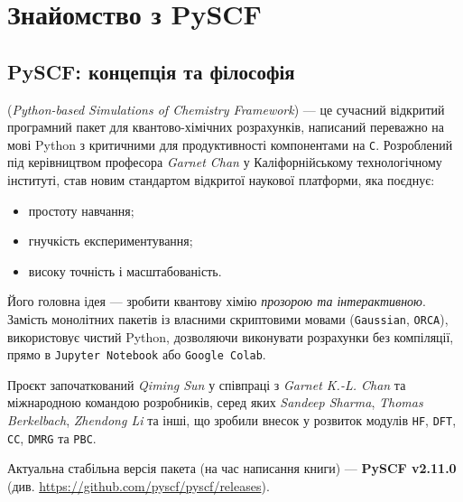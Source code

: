 
\chapter{Знайомство з PySCF}\label{\currfilebase}

\section{PySCF: концепція та філософія}

\PySCF{} (\emph{Python-based Simulations of Chemistry Framework}) --- це сучасний відкритий програмний пакет для квантово-хімічних розрахунків, написаний переважно на мові Python з критичними для продуктивності компонентами на \texttt{C}.
Розроблений під керівництвом професора \emph{Garnet Chan} у Каліфорнійському технологічному інституті, \PySCF{} став новим стандартом відкритої наукової платформи, яка поєднує:
\begin{itemize}
    \item простоту навчання;
    \item гнучкість експериментування;
    \item високу точність і масштабованість.
\end{itemize}

Його головна ідея --- зробити квантову хімію \emph{прозорою та інтерактивною}.
Замість монолітних пакетів із власними скриптовими мовами (\texttt{Gaussian}, \texttt{ORCA}), \PySCF{} використовує чистий Python, дозволяючи виконувати розрахунки без компіляції, прямо в \texttt{Jupyter Notebook} або \texttt{Google Colab}.

Проєкт започаткований \emph{Qiming Sun} у співпраці з \emph{Garnet K.-L. Chan} та міжнародною командою розробників, серед яких \emph{Sandeep Sharma}, \emph{Thomas Berkelbach}, \emph{Zhendong Li} та інші, що зробили внесок у розвиток модулів \texttt{HF}, \texttt{DFT}, \texttt{CC}, \texttt{DMRG} та \texttt{PBC}.

Актуальна стабільна версія пакета (на час написання книги) — \textbf{PySCF v2.11.0} (див. \url{https://github.com/pyscf/pyscf/releases}).




